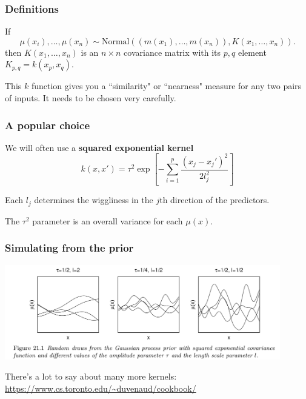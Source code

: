 \documentclass{beamer}
\begin{document}
\begin{frame}
\frametitle{Definitions}

If
$$
\mu(x_i), \ldots, \mu(x_n) \sim \text{Normal}( (m(x_1), \ldots, m(x_n)), K(x_1, \ldots, x_n)).
$$
then $K(x_1, \ldots, x_n)$ is an $n \times n$ covariance matrix with its $p,q$ element $K_{p,q} = k(x_p,x_q)$.
\newline

This $k$ function gives you a ``similarity" or ``nearness" measure for any two pairs of inputs. It needs to be chosen very carefully. 
\newline


\end{frame}

\begin{frame}
\frametitle{A popular choice}

We will often use a {\bf squared exponential kernel} 
$$
k(x,x') = \tau^2 \exp\left[-\sum_{i=1}^p \frac{ (x_j - x_j')^2 }{2 l_j^2} \right]
$$ 

Each $l_j$ determines the wiggliness in the $j$th direction of the predictors.
\newline

The $\tau^2$ parameter is an overall variance for each $\mu(x)$.


\end{frame}

\begin{frame}
\frametitle{Simulating from the prior}


\begin{center}
\includegraphics[width=120mm]{mu_realizations.png}
\end{center}

There's a lot to say about many more kernels: \url{https://www.cs.toronto.edu/~duvenaud/cookbook/}


\end{frame}
\end{document}
